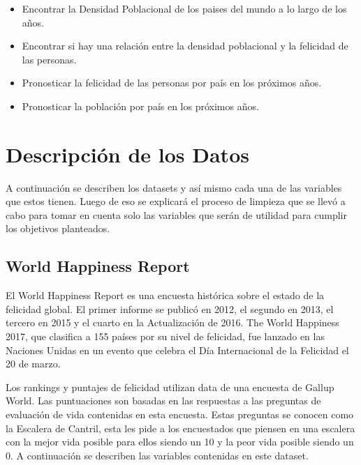 \documentclass[]{article}
\begin{document}
\begin{itemize}
     \item Encontrar la Densidad Poblacional de los paises del mundo a lo largo de los años.
     \item Encontrar si hay una relación entre la densidad poblacional y la felicidad de las personas.
     \item Pronosticar la felicidad de las personas por país en los próximos años.
     \item Pronosticar la población por país en los próximos años.
\end{itemize}

\section{Descripción de los Datos}\label{descripcion-de-los-datos}

A continuación se describen los datasets y así mismo cada una de las
variables que estos tienen. Luego de eso se explicará el proceso de
limpieza que se llevó a cabo para tomar en cuenta solo las variables que
serán de utilidad para cumplir los objetivos planteados.

\subsection{World Happiness Report}\label{world-happiness-report}

El World Happiness Report es una encuesta histórica sobre el estado de
la felicidad global. El primer informe se publicó en 2012, el segundo en
2013, el tercero en 2015 y el cuarto en la Actualización de 2016. The
World Happiness 2017, que clasifica a 155 países por su nivel de
felicidad, fue lanzado en las Naciones Unidas en un evento que celebra
el Día Internacional de la Felicidad el 20 de marzo.

Los rankings y puntajes de felicidad utilizan data de una encuesta de
Gallup World. Las puntuaciones son basadas en las respuestas a las
preguntas de evaluación de vida contenidas en esta encuesta. Estas
preguntas se conocen como la Escalera de Cantril, esta les pide a los
encuestados que piensen en una escalera con la mejor vida posible para
ellos siendo un 10 y la peor vida posible siendo un 0. A continuación se
describen las variables contenidas en este dataset.
\end{document}
